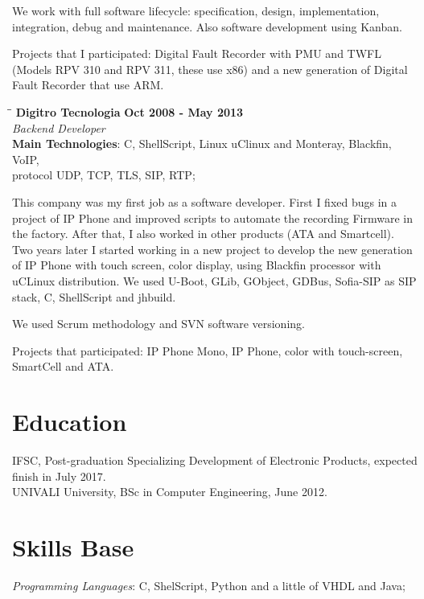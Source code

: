 \documentclass[margin]{res}
\begin{document}
\begin{resume}
We work with full software lifecycle: specification, design, implementation, integration, debug and maintenance. Also software development using Kanban.

Projects that I participated: Digital Fault Recorder with PMU and TWFL (Models RPV 310 and RPV 311, these use x86) and a new generation of Digital Fault Recorder that use ARM.

\vspace{-0.1in}
    \begin{tabbing}
    \hspace{2.3in}\= \hspace{1.7in}\= \kill
    \textbf{Digitro Tecnologia}    \>\>\textbf{Oct 2008 - May 2013}\\
    \textit{Backend Developer}\\
    \textbf{Main Technologies}: C, ShellScript, Linux uClinux and Monteray, Blackfin, VoIP,\\ protocol UDP, TCP, TLS, SIP, RTP;
    \end{tabbing}\vspace{-20pt}
    \vspace{2mm}
This company was my first job as a software developer. First I fixed bugs in a project of IP Phone and improved scripts to automate the recording Firmware in the factory. After that, I also worked in other products (ATA and Smartcell). Two years later I started working in a new project to develop the new generation of IP Phone with touch screen, color display, using Blackfin processor with uCLinux distribution. We used U-Boot, GLib, GObject, GDBus, Sofia-SIP as SIP stack, C, ShellScript and jhbuild.

We used Scrum methodology and SVN software versioning.

Projects that participated: IP Phone Mono, IP Phone, color with touch-screen, SmartCell and ATA. 

\section{Education}
 IFSC, Post-graduation Specializing Development of Electronic Products, expected finish in July 2017.\\
 UNIVALI University, BSc in Computer Engineering, June 2012.

\section{Skills Base} \textit{Programming Languages}: C, ShelScript, Python and a little of VHDL and Java;


\end{resume}
\end{document}
